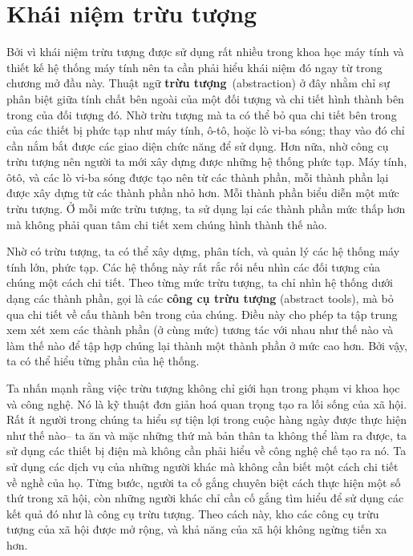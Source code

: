 \section{Khái niệm trừu tượng}
 
Bởi vì khái niệm trừu tượng được sử dụng rất nhiều trong khoa học máy tính và thiết kế hệ
thống máy tính nên ta cần phải hiểu khái niệm đó ngay từ trong chương mở đầu này. Thuật
ngữ \textbf{trừu tượng}~(abstraction) ở đây nhằm chỉ sự phân biệt giữa tính chất bên ngoài
của một đối tượng và chi tiết hình thành bên trong của đối tượng đó. Nhờ trừu tượng mà ta
có thể bỏ qua chi tiết bên trong của các thiết bị phức tạp như máy tính, ô-tô, hoặc lò
vi-ba sóng; thay vào đó chỉ cần nắm bắt được các giao diện chức năng để sử dụng.  Hơn nữa,
nhờ công cụ trừu tượng nên người ta mới xây dựng được những hệ thống phức tạp.  Máy tính,
ôtô, và các lò vi-ba sóng được tạo nên từ các thành phần, mỗi thành phần lại được xây dựng
từ các thành phần nhỏ hơn. Mỗi thành phần biểu diễn một mức trừu tượng. Ở mỗi mức trừu
tượng, ta sử dụng lại các thành phần mức thấp hơn mà không phải quan tâm chi tiết xem
chúng hình thành thế nào.

Nhờ có trừu tượng, ta có thể xây dựng, phân tích, và quản lý các hệ thống máy tính lớn,
phức tạp. Các hệ thống này rất rắc rối nếu nhìn các đối tượng của chúng một cách chi
tiết. Theo từng mức trừu tượng, ta chỉ nhìn hệ thống dưới dạng các thành phần, gọi là các
\textbf{công cụ trừu tượng} (abstract tools), mà bỏ qua chi tiết về cấu thành bên trong
của chúng. Điều này cho phép ta tập trung xem xét xem các thành phần (ở cùng mức) tương
tác với nhau như thế nào và làm thế nào để tập hợp chúng lại thành một thành phần ở mức
cao hơn. Bởi vậy, ta có thể hiểu từng phần của hệ thống.

Ta nhấn mạnh rằng việc trừu tượng không chỉ giới hạn trong phạm vi khoa học và công
nghệ. Nó là kỹ thuật đơn giản hoá quan trọng tạo ra lối sống của xã hội. Rất ít người
trong chúng ta hiểu sự tiện lợi trong cuộc hàng ngày được thực hiện như thế nào-- ta ăn và
mặc những thứ mà bản thân ta không thể làm ra được, ta sử dụng các thiết bị điện mà không
cần phải hiểu về công nghệ chế tạo ra nó. Ta sử dụng các dịch vụ của những người khác mà
không cần biết một cách chi tiết về nghề của họ. Từng bước, người ta cố gắng chuyên biệt
cách thực hiện một số thứ trong xã hội, còn những người khác chỉ cần cố gắng tìm hiểu để
sử dụng các kết quả đó như là công cụ trừu tượng. Theo cách này, kho các công cụ trừu
tượng của xã hội được mở rộng, và khả năng của xã hội không ngừng tiến xa hơn.

